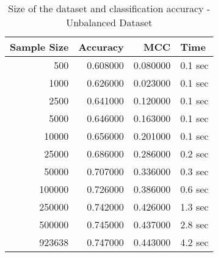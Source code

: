 \begin{table}
\caption{Size of the dataset and classification accuracy - Unbalanced Dataset}
\label{tab:unbal_size}
\begin{tabular}{rrrl}
\toprule
Sample Size & Accuracy & MCC & Time \\
\midrule
500 & 0.608000 & 0.080000 & 0.1 sec \\
1000 & 0.626000 & 0.023000 & 0.1 sec \\
2500 & 0.641000 & 0.120000 & 0.1 sec \\
5000 & 0.646000 & 0.163000 & 0.1 sec \\
10000 & 0.656000 & 0.201000 & 0.1 sec \\
25000 & 0.686000 & 0.286000 & 0.2 sec \\
50000 & 0.707000 & 0.336000 & 0.3 sec \\
100000 & 0.726000 & 0.386000 & 0.6 sec \\
250000 & 0.742000 & 0.426000 & 1.3 sec \\
500000 & 0.745000 & 0.437000 & 2.8 sec \\
923638 & 0.747000 & 0.443000 & 4.2 sec \\
\bottomrule
\end{tabular}
\end{table}
